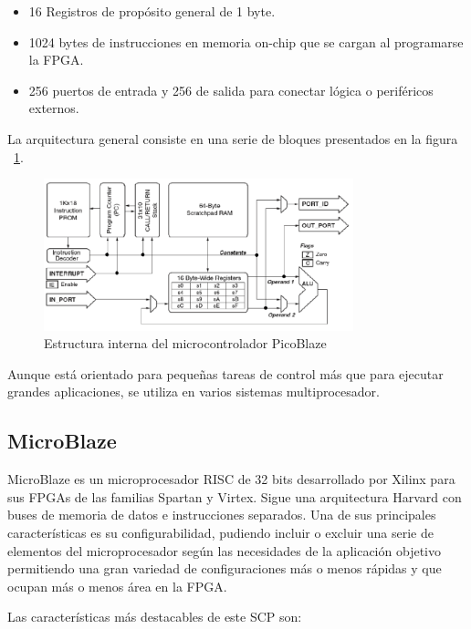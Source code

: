   
	\begin{itemize}
	  \item  16 Registros de propósito general de 1 byte.
	  \item 1024 bytes de instrucciones en memoria on-chip que se cargan al programarse la FPGA.
	  \item 256 puertos de entrada y 256 de salida para conectar lógica o periféricos externos.
	\end{itemize}
	
	La arquitectura general consiste en una serie de bloques presentados en la figura ~\ref{fig:PicoBlazer}.
		
	\begin{figure}[h!]
 	\begin{center}
  	\includegraphics[width=0.8\textwidth,keepaspectratio=true]{./images/estructurapico}
  	\caption{Estructura interna del microcontrolador PicoBlaze}
  	\label{fig:PicoBlazer}
 	\end{center}
	\end{figure}

Aunque está orientado para pequeñas tareas de control más que para ejecutar grandes aplicaciones, se utiliza en varios sistemas multiprocesador.

	\subsection{MicroBlaze}

MicroBlaze es un microprocesador RISC de 32 bits desarrollado por Xilinx para sus FPGAs de las familias Spartan y Virtex. Sigue una arquitectura Harvard con buses de memoria de datos e instrucciones separados. Una de sus principales características es su configurabilidad, pudiendo incluir o excluir una serie de elementos del microprocesador según las necesidades de la aplicación objetivo permitiendo una gran variedad de configuraciones más o menos rápidas y que ocupan más o menos área en la FPGA.

Las características más destacables de este SCP son:    

